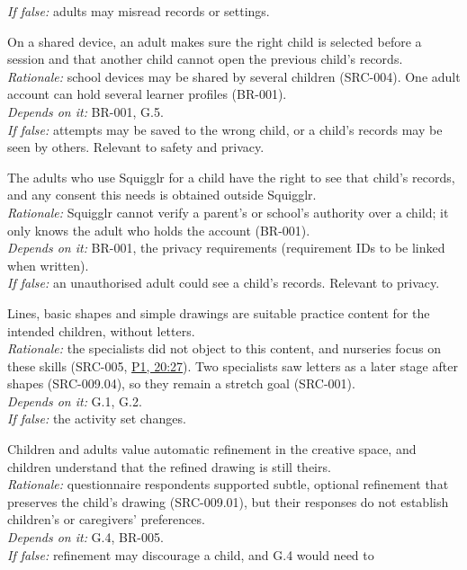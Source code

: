 \documentclass[12pt]{article}
\renewcommand{\_}{\textunderscore\allowbreak}%
\newcommand{\intlink}[3]{\hyperref[int:#1-#2]{#3}}
\newcommand{\intref}[2]{\intlink{#1}{#2}{#1, #2}}
\begin{document}
\begin{description}[style=nextline]
\emph{If false:} adults may misread records or settings.
\item[ASM-008] On a shared device, an adult makes sure the right child is
selected before a session and that another child cannot open the previous
child's records.\\
\emph{Rationale:} school devices may be shared by several children (SRC-004).
One adult account can hold several learner profiles (BR-001).\\
\emph{Depends on it:} BR-001, G.5.\\
\emph{If false:} attempts may be saved to the wrong child, or a child's records
may be seen by others. Relevant to safety and privacy.
\item[ASM-009] The adults who use Squigglr for a child have the right to see
that child's records, and any consent this needs is obtained outside Squigglr.\\
\emph{Rationale:} Squigglr cannot verify a parent's or school's authority over a
child; it only knows the adult who holds the account (BR-001).\\
\emph{Depends on it:} BR-001, the privacy requirements (requirement IDs to be
linked when written).\\
\emph{If false:} an unauthorised adult could see a child's records. Relevant to
privacy.
\item[ASM-010] Lines, basic shapes and simple drawings are suitable practice
content for the intended children, without letters.\\
\emph{Rationale:} the specialists did not object to this content, and nurseries
focus on these skills (SRC-005, \intref{P1}{20:27}). Two specialists saw letters
as a later stage after shapes (SRC-009.04), so they remain a stretch goal
(SRC-001).\\
\emph{Depends on it:} G.1, G.2.\\
\emph{If false:} the activity set changes.
\item[ASM-011] Children and adults value automatic refinement in the creative
space, and children understand that the refined drawing is still theirs.\\
\emph{Rationale:} questionnaire respondents supported subtle, optional
refinement that preserves the child's drawing (SRC-009.01), but their responses
do not establish children's or caregivers' preferences.\\
\emph{Depends on it:} G.4, BR-005.\\
\emph{If false:} refinement may discourage a child, and G.4 would need to

\end{description}
\end{document}
